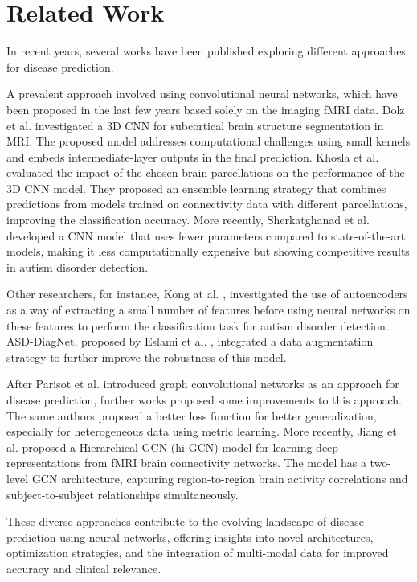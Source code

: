 \section{Related Work}

\quad In recent years, several works have been published exploring different approaches for disease prediction.

A prevalent approach involved using convolutional neural networks, which have been proposed in the last few years based solely on the imaging fMRI data. Dolz et al. \cite{Dolz2018} investigated a 3D CNN for subcortical brain structure segmentation in MRI. The proposed model addresses computational challenges using small kernels and embeds intermediate-layer outputs in the final prediction. Khosla et al. \cite{Khosla2019} evaluated the impact of the chosen brain parcellations on the performance of the 3D CNN model. They proposed an ensemble learning strategy that combines predictions from models trained on connectivity data with different parcellations, improving the classification accuracy. More recently, Sherkatghanad et al. \cite{Sherkatghanad2020} developed a CNN model that uses fewer parameters compared to state-of-the-art models, making it less computationally expensive but showing competitive results in autism disorder detection.

Other researchers, for instance, Kong at al. \cite{Kong2019}, investigated the use of autoencoders as a way of extracting a small number of features before using neural networks on these features to perform the classification task for autism disorder detection. ASD-DiagNet, proposed by Eslami et al. \cite{Eslami2019}, integrated a data augmentation strategy to further improve the robustness of this model.

After Parisot et al. \cite{Parisot17} introduced graph convolutional networks as an approach for disease prediction, further works proposed some improvements to this approach. The same authors proposed a better loss function for better generalization, especially for heterogeneous data using metric learning. More recently, Jiang et al. \cite{Jiang2020} proposed a Hierarchical GCN (hi-GCN) model for learning deep representations from fMRI brain connectivity networks. The model has a two-level GCN architecture, capturing region-to-region brain activity correlations and subject-to-subject relationships simultaneously.

These diverse approaches contribute to the evolving landscape of disease prediction using neural networks, offering insights into novel architectures, optimization strategies, and the integration of multi-modal data for improved accuracy and clinical relevance.